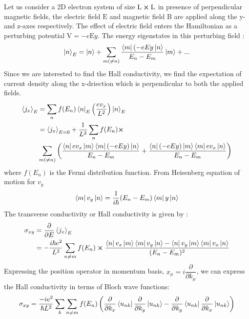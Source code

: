 Let us consider a 2D electron system of size $ \mathrm{L} \cross \mathrm{L} $ in presence of perpendicular magnetic fields, the electric field $ \mathrm{E}$ and magnetic field $\mathrm{B}$ are applied along the y- and z-axes respectively. The effect of electric field enters the Hamiltonian as a perturbing potential $\mathrm{V} = -e\mathrm{E}y $. The energy eigenstates in this perturbing field :
\begin{equation}
    \ket{n}_{E} = \ket{n} + \sum^{}_{m(\neq n)}\frac{\bra{m}(-eEy\ket{n}}{E_n - E_m}\ket{m} + ...
\end{equation}
Since we are interested to find the Hall conductivity, we find the expectation of current density along the x-driection which is perpendicular to both the applied fields.
\begin{equation}
\begin{split}
    \expval{j_x}_E &= \sum^{}_{n}f(E_n)\bra{n}_E\left( \frac{ev_x}{L^2} \right)\ket{n}_E\\
    &= \expval{j_x}_{E=0} + \frac{1}{L^2}\sum^{}_{n}f(E_n) \cross\\
    & \sum^{}_{m(\neq n)} \left( \frac{\bra{n}ev_x\ket{m}\bra{m}(-eEy)\ket{n}}{E_n - E_m} + \frac{\bra{n}(-eEy)\ket{m}\bra{m}ev_x\ket{n}}{E_n - E_m} \right)
\end{split}
\end{equation}
where $ f(E_n) $ is the Fermi distribution function. From Heisenberg equation of motion for $v_y$
\begin{equation}
    \bra{m}v_y\ket{n} = \frac{1}{i\hbar}(E_n - E_m)\bra{m}y\ket{n}
\end{equation}
The transverse conductivity or Hall conductivity is given by :
\begin{equation}
    \begin{split}
        \sigma _{xy} &= \dfrac{\partial}{\partial E} \expval{j_x}_E\\
        &= -\frac{i\hbar e^2}{L^2}\sum^{}_{n\neq m}f(E_n)\cross \frac{\bra{n}v_x\ket{m}\bra{m}v_y\ket{n} - \bra{n}v_y\ket{m}\bra{m}v_x\ket{n}}{(E_n - E_m)^2}
    \end{split}
\end{equation}
Expressing the position operator in momentum basis, $ x_{\mu} = i\dfrac{\partial}{\partial k_{\mu}} $, we can express the Hall conductivity in terms of Bloch wave functions:
\begin{equation}
    \sigma _{xy} = \frac{-ie^2}{\hbar L^2}\sum^{}_{k}\sum^{}_{n \neq m} f(E_n)\left( \dfrac{\partial}{\partial k_x}\bra{u_{nk}}\dfrac{\partial}{\partial k_y}\ket{u_{nk}} - \dfrac{\partial}{\partial k_y}\bra{u_{nk}}\dfrac{\partial}{\partial k_x}\ket{u_{nk}} \right)
\end{equation}
